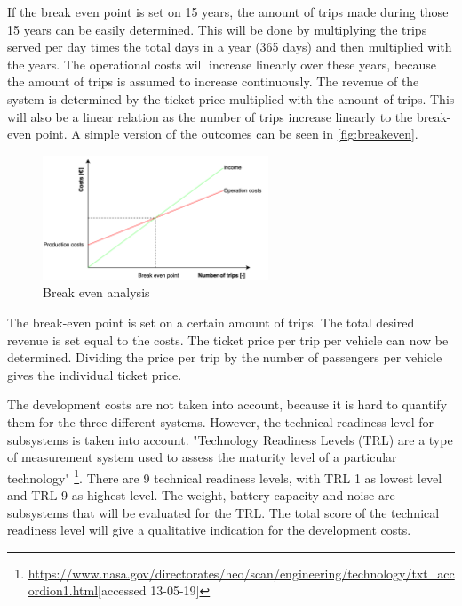 If the break even point is set on 15 years, the amount of trips made during those 15 years can be easily determined. This will be done by multiplying the trips served per day times the total days in a year (365 days) and then multiplied with the years. The operational costs will increase linearly over these years, because the amount of trips is assumed to increase continuously. The revenue of the system is determined by the ticket price multiplied with the amount of trips. This will also be a linear relation as the number of trips increase linearly to the break-even point. A simple version of the outcomes can be seen in \autoref{fig:breakeven}.

\begin{figure}[H]
    \centering
    \captionsetup{justification=centering}
    \includegraphics[width=0.6\textwidth]{Figures/Ticketprice.png}
    \captionsetup{justification=centering}
    \caption{Break even analysis}
    \label{fig:breakeven}
\end{figure}

The break-even point is set on a certain amount of trips. The total desired revenue is set equal to the costs. The ticket price per trip per vehicle can now be determined. Dividing the price per trip by the number of passengers per vehicle gives the individual ticket price.

The development costs are not taken into account, because it is hard to quantify them for the three different systems. However, the technical readiness level for subsystems is taken into account. "Technology Readiness Levels (TRL) are a type of measurement system used to assess the maturity level of a particular technology" \footnote{\url{https://www.nasa.gov/directorates/heo/scan/engineering/technology/txt_accordion1.html}[accessed 13-05-19]}. There are 9 technical readiness levels, with TRL 1 as lowest level and TRL 9 as highest level. The weight, battery capacity and noise are subsystems that will be evaluated for the TRL. The total score of the technical readiness level will give a qualitative indication for the development costs. 

